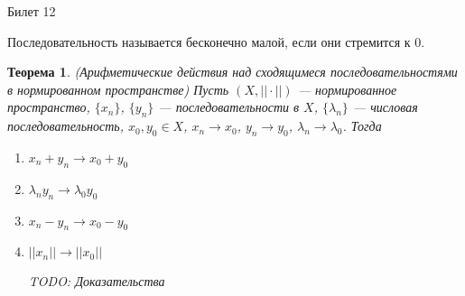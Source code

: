 \documentclass[12pt,a4paper]{article}
\newtheorem*{theorem*}{Теорема}
\begin{document}
\begin{center}
Билет 12
\end{center}

Последовательность называется бесконечно малой, если они стремится к $0$.

\begin{theorem*}(Арифметические действия над 
\newline сходящимеся последовательностями в 
\newline нормированном пространстве)
\label{12.1}
Пусть $(X, ||\cdot||)$ --- нормированное пространство, $\{ x_n \}$, $\{ y_n \}$ --- последовательности в $X$, $\{\lambda_n\}$ --- числовая последовательность, $x_0, y_0 \in X$, $x_n \rightarrow x_0$, $y_n \rightarrow y_0$, $\lambda_n \rightarrow \lambda_0$. Тогда
\begin{enumerate}
\item $x_n + y_n \rightarrow x_0 + y_0$
\item $\lambda_n y_n \rightarrow \lambda_0 y_0$
\item $x_n - y_n \rightarrow x_0 - y_0$
\item $||x_n|| \rightarrow ||x_0||$

TODO: Доказательства
\end{enumerate}
\end{theorem*}
\end{document}
